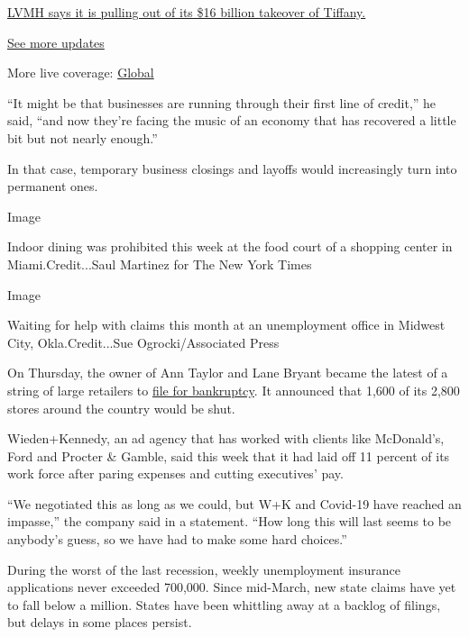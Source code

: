 \href{https://www.nytimes3xbfgragh.onion/live/2020/09/09/business/stock-market-today-coronavirus?action=click\&pgtype=Article\&state=default\&region=MAIN_CONTENT_1\&context=storylines_live_updates\#lvmh-says-it-is-pulling-out-of-its-16-billion-takeover-of-tiffany}{LVMH
says it is pulling out of its \$16 billion takeover of Tiffany.}

\href{https://www.nytimes3xbfgragh.onion/live/2020/09/09/business/stock-market-today-coronavirus?action=click\&pgtype=Article\&state=default\&region=MAIN_CONTENT_1\&context=storylines_live_updates}{See
more updates}

More live coverage:
\href{https://www.nytimes3xbfgragh.onion/2020/09/09/world/covid-19-coronavirus.html?action=click\&pgtype=Article\&state=default\&region=MAIN_CONTENT_1\&context=storylines_live_updates}{Global}

``It might be that businesses are running through their first line of
credit,'' he said, ``and now they're facing the music of an economy that
has recovered a little bit but not nearly enough.''

In that case, temporary business closings and layoffs would increasingly
turn into permanent ones.

Image

Indoor dining was prohibited this week at the food court of a shopping
center in Miami.Credit...Saul Martinez for The New York Times

Image

Waiting for help with claims this month at an unemployment office in
Midwest City, Okla.Credit...Sue Ogrocki/Associated Press

On Thursday, the owner of Ann Taylor and Lane Bryant became the latest
of a string of large retailers to
\href{https://www.nytimes3xbfgragh.onion/2020/07/23/business/ascena-bankruptcy-ann-taylor-lane-bryant.html}{file
for bankruptcy}. It announced that 1,600 of its 2,800 stores around the
country would be shut.

Wieden+Kennedy, an ad agency that has worked with clients like
McDonald's, Ford and Procter \& Gamble, said this week that it had laid
off 11 percent of its work force after paring expenses and cutting
executives' pay.

``We negotiated this as long as we could, but W+K and Covid-19 have
reached an impasse,'' the company said in a statement. ``How long this
will last seems to be anybody's guess, so we have had to make some hard
choices.''

During the worst of the last recession, weekly unemployment insurance
applications never exceeded 700,000. Since mid-March, new state claims
have yet to fall below a million. States have been whittling away at a
backlog of filings, but delays in some places persist.

